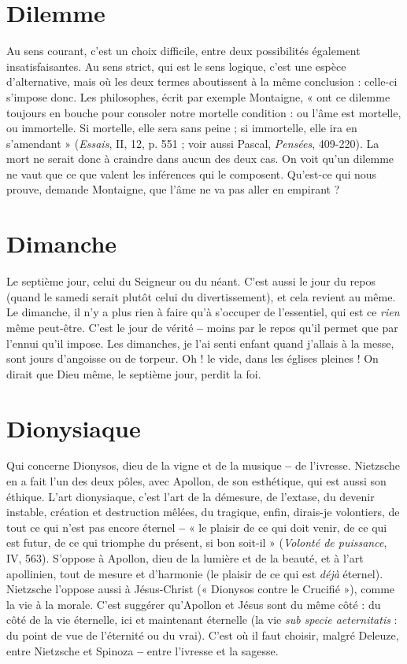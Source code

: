 \section{Dilemme}
Au sens courant, c’est un choix difficile, entre deux possibilités
également insatisfaisantes. Au sens strict, qui est le sens logique,
c’est une espèce d’alternative, mais où les deux termes aboutissent à la même
conclusion : celle-ci s'impose donc. Les philosophes, écrit par exemple Montaigne,
« ont ce dilemme toujours en bouche pour consoler notre mortelle condition : ou
l’âme est mortelle, ou immortelle. Si mortelle, elle sera sans peine ; si immortelle,
elle ira en s’amendant » ({\it Essais}, II, 12, p. 551 ; voir aussi Pascal, {\it Pensées}, 409-220).
La mort ne serait donc à craindre dans aucun des deux cas. On voit qu'un
dilemme ne vaut que ce que valent les inférences qui le composent. Qu'est-ce qui
nous prouve, demande Montaigne, que l’âme ne va pas aller en empirant ?

\section{Dimanche}
Le septième jour, celui du Seigneur ou du néant. C’est aussi
le jour du repos (quand le samedi serait plutôt celui du divertissement),
et cela revient au même. Le dimanche, il n’y a plus rien à faire qu’à
s'occuper de l'essentiel, qui est ce {\it rien} même peut-être. C’est le jour de vérité
{\bf --} moins par le repos qu’il permet que par l'ennui qu’il impose. Les dimanches,
je l’ai senti enfant quand j'allais à la messe, sont jours d’angoisse ou de torpeur.
Oh ! le vide, dans les églises pleines ! On dirait que Dieu même, le septième
jour, perdit la foi.

\section{Dionysiaque}
Qui concerne Dionysos, dieu de la vigne et de la musique
{\bf --} de l'ivresse. Nietzsche en a fait l’un des deux pôles, avec
Apollon, de son esthétique, qui est aussi son éthique. L’art dionysiaque, c’est
l’art de la démesure, de l’extase, du devenir instable, création et destruction
mêlées, du tragique, enfin, dirais-je volontiers, de tout ce qui n’est pas encore
éternel {\bf --} « le plaisir de ce qui doit venir, de ce qui est futur, de ce qui triomphe
du présent, si bon soit-il » ({\it Volonté de puissance}, IV, 563). S’oppose à Apollon,
dieu de la lumière et de la beauté, et à l’art apollinien, tout de mesure et d’harmonie
(le plaisir de ce qui est {\it déjà} éternel). Nietzsche l’oppose aussi à Jésus-Christ
(« Dionysos contre le Crucifié »), comme la vie à la morale. C’est suggérer
qu’Apollon et Jésus sont du même côté : du côté de la vie éternelle, ici et
maintenant éternelle (la vie {\it sub specie aeternitatis} : du point de vue de l’éternité
ou du vrai). C’est où il faut choisir, malgré Deleuze, entre Nietzsche et Spinoza
{\bf --} entre l’ivresse et la sagesse.

